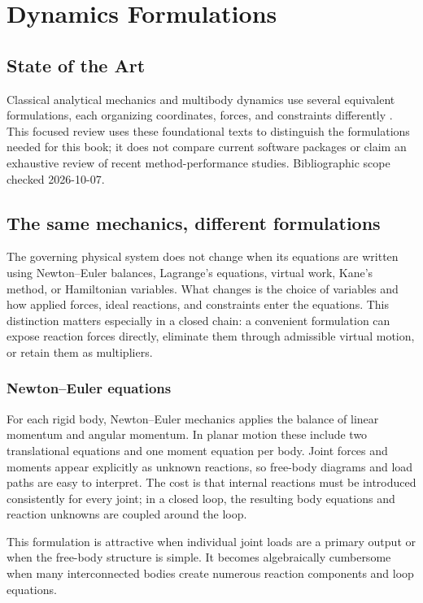 \documentclass[../main.tex]{subfiles}
\begin{document}
\chapter{Dynamics Formulations}
\label{chap:dynamics-formulations}

\section{State of the Art}
Classical analytical mechanics and multibody dynamics use several equivalent formulations, each organizing coordinates, forces, and constraints differently \cite{goldstein2002classical,shabana2013dynamics}. This focused review uses these foundational texts to distinguish the formulations needed for this book; it does not compare current software packages or claim an exhaustive review of recent method-performance studies. Bibliographic scope checked 2026-10-07.

\section{The same mechanics, different formulations}

The governing physical system does not change when its equations are written using Newton--Euler balances, Lagrange's equations, virtual work, Kane's method, or Hamiltonian variables. What changes is the choice of variables and how applied forces, ideal reactions, and constraints enter the equations. This distinction matters especially in a closed chain: a convenient formulation can expose reaction forces directly, eliminate them through admissible virtual motion, or retain them as multipliers.

\subsection{Newton--Euler equations}

For each rigid body, Newton--Euler mechanics applies the balance of linear momentum and angular momentum. In planar motion these include two translational equations and one moment equation per body. Joint forces and moments appear explicitly as unknown reactions, so free-body diagrams and load paths are easy to interpret. The cost is that internal reactions must be introduced consistently for every joint; in a closed loop, the resulting body equations and reaction unknowns are coupled around the loop.

This formulation is attractive when individual joint loads are a primary output or when the free-body structure is simple. It becomes algebraically cumbersome when many interconnected bodies create numerous reaction components and loop equations.
\end{document}

